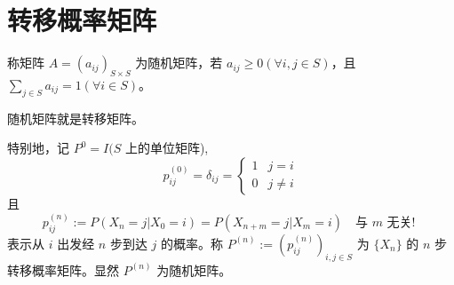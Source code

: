 \documentclass[lang=cn,10pt,thmcnt=section]{elegantbook}
\begin{document}
\section{转移概率矩阵}
\begin{definition}[随机矩阵]
	称矩阵 $A = (a_{ij})_{S \times S}$ 为随机矩阵，若 $a_{ij} \geq 0 (\forall i, j \in S)$，且 $\sum_{j \in S} a_{ij} = 1 (\forall i \in S)$。
\end{definition}
\begin{remark}
	随机矩阵就是转移矩阵。
\end{remark}
特别地，记 $P^0 = I(S$ 上的单位矩阵),
\[
p_{ij}^{(0)} = \delta_{ij} = 
\begin{cases} 
1 & j = i \\
0 & j \neq i 
\end{cases}
\]
且
\[
p_{ij}^{(n)} := P(X_n = j | X_0 = i) = P(X_{n+m} = j | X_m = i) \quad \text{与 } m \text{ 无关! }
\]
表示从 $i$ 出发经 $n$ 步到达 $j$ 的概率。称 $P^{(n)} := (p_{ij}^{(n)})_{i,j \in S}$ 为 $\{X_n\}$ 的 $n$ 步转移概率矩阵。显然 $P^{(n)}$ 为随机矩阵。
\end{document}
